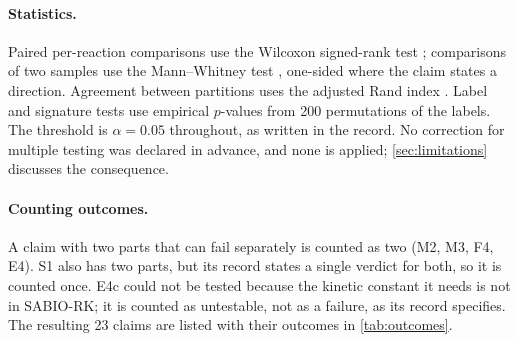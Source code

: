 \paragraph{Statistics.}
Paired per-reaction comparisons use the Wilcoxon signed-rank test \citep{wilcoxon1945individual}; comparisons of two samples use the Mann--Whitney test \citep{mann1947test}, one-sided where the claim states a direction.
Agreement between partitions uses the adjusted Rand index \citep{hubert1985comparing}.
Label and signature tests use empirical $p$-values from 200 permutations of the labels.
The threshold is $\alpha=0.05$ throughout, as written in the record.
No correction for multiple testing was declared in advance, and none is applied; \cref{sec:limitations} discusses the consequence.

\paragraph{Counting outcomes.}
A claim with two parts that can fail separately is counted as two (M2, M3, F4, E4).
S1 also has two parts, but its record states a single verdict for both, so it is counted once.
E4c could not be tested because the kinetic constant it needs is not in SABIO-RK; it is counted as untestable, not as a failure, as its record specifies.
The resulting 23 claims are listed with their outcomes in \cref{tab:outcomes}.
